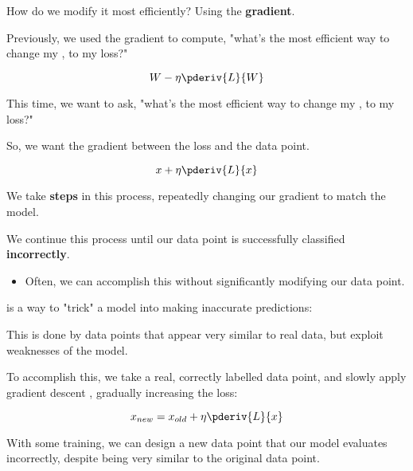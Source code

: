         How do we modify it most efficiently? Using the \textbf{gradient}.

        Previously, we used the gradient to compute, "what's the most efficient way to change my , to  my loss?"

        \begin{equation}
            W - \eta \pderiv{L}{W}
        \end{equation}

        This time, we want to ask, "what's the most efficient way to change my , to  my loss?"

        So, we want the gradient between the loss and the data point.

        \begin{equation}
            x + \eta \pderiv{L}{x}
        \end{equation}

        We take \textbf{steps} in this process, repeatedly changing our gradient to match the model.

        We continue this process until our data point is successfully classified \textbf{incorrectly}.

        \begin{itemize}
            \item Often, we can accomplish this without significantly modifying our data point.\\
        \end{itemize}

        \begin{definition}
             is a way to "trick" a model into making inaccurate predictions:
            
            This is done by  data points that appear very similar to real data, but exploit weaknesses of the model.

            \subsecdiv

            To accomplish this, we take a real, correctly labelled data point, and slowly apply gradient descent , gradually increasing the loss:

            \begin{equation*}
                x_{new} = x_{old} + \eta \pderiv{L}{x}
            \end{equation*}

            With some training, we can design a new data point that our model evaluates incorrectly, despite being very similar to the original data point.
        \end{definition}

